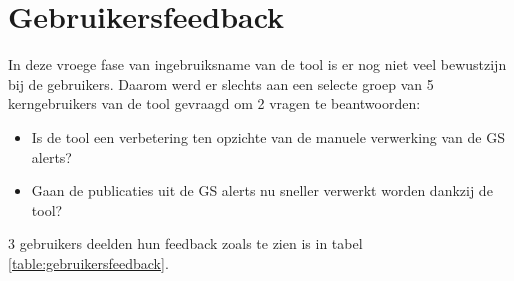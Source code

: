 \section{Gebruikersfeedback}
In deze vroege fase van ingebruiksname van de tool is er nog niet veel bewustzijn bij de gebruikers.
Daarom werd er slechts aan een selecte groep van 5 kerngebruikers van de tool gevraagd om 2 vragen te beantwoorden:
\begin{itemize}
    \item Is de tool een verbetering ten opzichte van de manuele verwerking van de GS alerts?
    \item Gaan de publicaties uit de GS alerts nu sneller verwerkt worden dankzij de tool?
\end{itemize}
3 gebruikers deelden hun feedback zoals te zien is in tabel \ref{table:gebruikersfeedback}.
